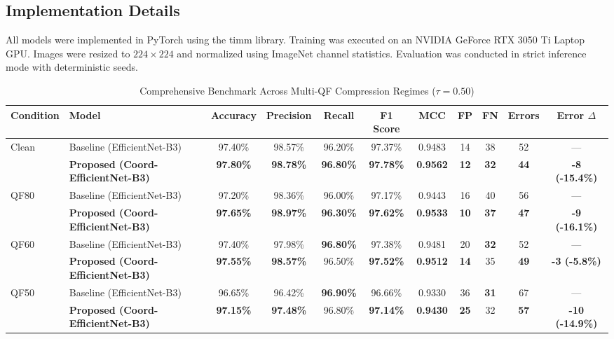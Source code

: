 \documentclass[conference]{IEEEtran}
\begin{document}
\subsection{Implementation Details}
All models were implemented in PyTorch using the timm library. Training was executed on an NVIDIA GeForce RTX 3050 Ti Laptop GPU. Images were resized to $224 \times 224$ and normalized using ImageNet channel statistics. Evaluation was conducted in strict inference mode with deterministic seeds.

\begin{table}[t]
\caption{Comprehensive Benchmark Across Multi-QF Compression Regimes ($\tau = 0.50$)}
\label{tab:master}
\centering
\begin{tabular}{llccccccccc}
\toprule
\textbf{Condition} & \textbf{Model} & \textbf{Accuracy} & \textbf{Precision} & \textbf{Recall} & \textbf{F1 Score} & \textbf{MCC} & \textbf{FP} & \textbf{FN} & \textbf{Errors} & \textbf{Error $\Delta$} \\
\midrule
Clean & Baseline (EfficientNet-B3) & 97.40\% & 98.57\% & 96.20\% & 97.37\% & 0.9483 & 14 & 38 & 52 & --- \\
      & \textbf{Proposed (Coord-EfficientNet-B3)} & \textbf{97.80\%} & \textbf{98.78\%} & \textbf{96.80\%} & \textbf{97.78\%} & \textbf{0.9562} & \textbf{12} & \textbf{32} & \textbf{44} & \textbf{-8 (-15.4\%)} \\
\midrule
QF80  & Baseline (EfficientNet-B3) & 97.20\% & 98.36\% & 96.00\% & 97.17\% & 0.9443 & 16 & 40 & 56 & --- \\
      & \textbf{Proposed (Coord-EfficientNet-B3)} & \textbf{97.65\%} & \textbf{98.97\%} & \textbf{96.30\%} & \textbf{97.62\%} & \textbf{0.9533} & \textbf{10} & \textbf{37} & \textbf{47} & \textbf{-9 (-16.1\%)} \\
\midrule
QF60  & Baseline (EfficientNet-B3) & 97.40\% & 97.98\% & \textbf{96.80\%} & 97.38\% & 0.9481 & 20 & \textbf{32} & 52 & --- \\
      & \textbf{Proposed (Coord-EfficientNet-B3)} & \textbf{97.55\%} & \textbf{98.57\%} & 96.50\% & \textbf{97.52\%} & \textbf{0.9512} & \textbf{14} & 35 & \textbf{49} & \textbf{-3 (-5.8\%)} \\
\midrule
QF50  & Baseline (EfficientNet-B3) & 96.65\% & 96.42\% & \textbf{96.90\%} & 96.66\% & 0.9330 & 36 & \textbf{31} & 67 & --- \\
      & \textbf{Proposed (Coord-EfficientNet-B3)} & \textbf{97.15\%} & \textbf{97.48\%} & 96.80\% & \textbf{97.14\%} & \textbf{0.9430} & \textbf{25} & 32 & \textbf{57} & \textbf{-10 (-14.9\%)} \\

\end{tabular}
\end{table}
\end{document}

